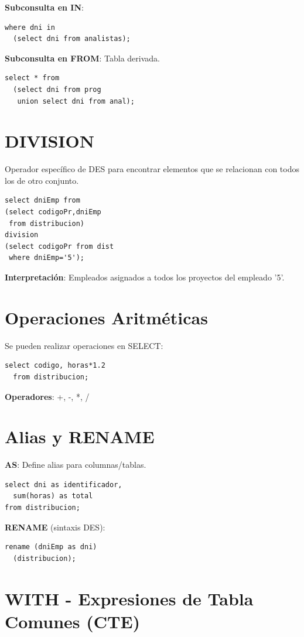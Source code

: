 \documentclass[10pt,a4paper,twocolumn]{article}
\begin{document}
\textbf{Subconsulta en IN}:
\begin{lstlisting}
where dni in 
  (select dni from analistas);
\end{lstlisting}

\textbf{Subconsulta en FROM}: Tabla derivada.
\begin{lstlisting}
select * from 
  (select dni from prog 
   union select dni from anal);
\end{lstlisting}

\section{DIVISION}

Operador específico de DES para encontrar elementos que se relacionan con todos los de otro conjunto.

\begin{lstlisting}
select dniEmp from
(select codigoPr,dniEmp 
 from distribucion)
division
(select codigoPr from dist
 where dniEmp='5');
\end{lstlisting}

\textbf{Interpretación}: Empleados asignados a todos los proyectos del empleado '5'.

\section{Operaciones Aritméticas}

Se pueden realizar operaciones en SELECT:
\begin{lstlisting}
select codigo, horas*1.2 
  from distribucion;
\end{lstlisting}

\textbf{Operadores}: +, -, *, /

\section{Alias y RENAME}

\textbf{AS}: Define alias para columnas/tablas.
\begin{lstlisting}
select dni as identificador,
  sum(horas) as total
from distribucion;
\end{lstlisting}

\textbf{RENAME} (sintaxis DES):
\begin{lstlisting}
rename (dniEmp as dni)
  (distribucion);
\end{lstlisting}

\section{WITH - Expresiones de Tabla Comunes (CTE)}
\end{document}
